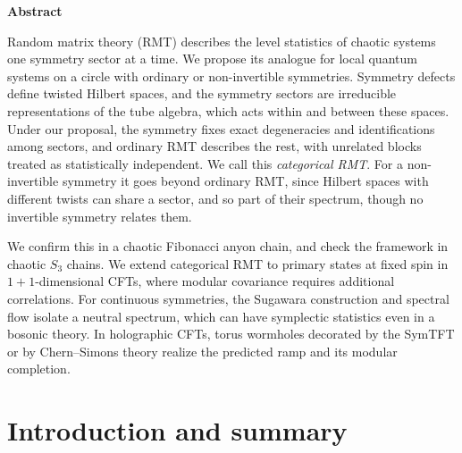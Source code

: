 \documentclass[11pt]{article}
\numberwithin{equation}{section}
\begin{document}
\begin{center}
{\bf Abstract}
\end{center}

Random matrix theory (RMT) describes the level statistics of chaotic systems one symmetry sector at a time. We propose its analogue for local quantum systems on a circle with ordinary or non-invertible symmetries. Symmetry defects define twisted Hilbert spaces, and the symmetry sectors are irreducible representations of the tube algebra, which acts within and between these spaces. Under our proposal, the symmetry fixes exact degeneracies and identifications among sectors, and ordinary RMT describes the rest, with unrelated blocks treated as statistically independent. We call this \emph{categorical RMT}. For a non-invertible symmetry it goes beyond ordinary RMT, since Hilbert spaces with different twists can share a sector, and so part of their spectrum, though no invertible symmetry relates them.

We confirm this in a chaotic Fibonacci anyon chain, and check the framework in chaotic $S_3$ chains. We extend categorical RMT to primary states at fixed spin in $1+1$-dimensional CFTs, where modular covariance requires additional correlations. For continuous symmetries, the Sugawara construction and spectral flow isolate a neutral spectrum, which can have symplectic statistics even in a bosonic theory. In holographic CFTs, torus wormholes decorated by the SymTFT or by Chern--Simons theory realize the predicted ramp and its modular completion.

\hspace{.3cm} 

\newpage


\tableofcontents

\vspace{10pt}
\section{Introduction and summary}
\end{document}
